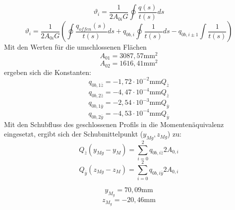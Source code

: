 \begin{equation}
	\vartheta_{i} = \frac{1}{2A_{0i}G}\oint\frac{q(s)}{t(s)}ds
\end{equation}
\begin{equation}
	\vartheta_{i} = \frac{1}{2A_{0i}G}(\oint\frac{q_{offen}(s)}{t(s)}ds+q_{0b,i}\oint\frac{1}{t(s)}ds-q_{0b,i\pm1}\int\frac{1}{t(s)})
\end{equation}
Mit den Werten für die umschlossenen Flächen
$$
	A_{01}=3087,57\mathrm{mm}^2
$$
$$
	A_{02}=1616,41\mathrm{mm}^2
$$
ergeben sich die Konstanten:
$$
	q_{0b,1\bar{z}}=-1,72\cdot10^{-2}\mathrm{mm}Q_{\bar{z}}
$$$$
	q_{0b,2\bar{z}}=-4,47\cdot10^{-4}\mathrm{mm}Q_{\bar{z}}
$$$$
	q_{0b,1\bar{y}}=-2,54\cdot10^{-3}\mathrm{mm}Q_{\bar{y}}
$$$$
	q_{0b,2\bar{y}}=-4,53\cdot10^{-4}\mathrm{mm}Q_{\bar{y}}
$$
Mit den Schubfluss des geschlossenen Profils in die Momentenäquivalenz eingesetzt, ergibt sich der Schubmittelpunkt ($y_{Mg}, z_{Mg}$) zu:
\begin{equation}
	Q_{\bar{z}}(y_{Mg}-y_{M})=\sum_{i=0}^{2}q_{0b,i\bar{z}}2A_{0,i}
\end{equation}
\begin{equation}
Q_{\bar{y}}(z_{Mg}-z_{M})=\sum_{i=0}^{2}q_{0b,i\bar{y}}2A_{0,i}
\end{equation}

$$
	y_{M_{g}}=70,09\mathrm{mm}
$$
$$
	z_{M_{g}}=-20,46\mathrm{mm}
$$
